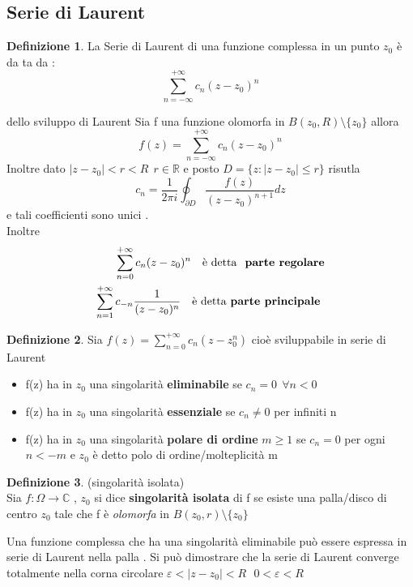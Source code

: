 \documentclass{article}
\theoremstyle{definition}
\newtheorem*{definizione}{Definizione}
\newcommand{\R}{\mathbb{R}}
\newcommand{\C}{\mathbb{C}}
\newcommand{\norm}[1]{|#1|}
\begin{document}
 				\subsection{Serie di Laurent}
 				\begin{definizione}
 					La Serie di Laurent di una funzione complessa in un punto $z_0$ è da ta da : 
 					$$\sum_{n=-\infty}^{+\infty}c_n(z-z_0)^n$$
 				\end{definizione}
 				\begin{teo}{dello sviluppo di Laurent}{}
Sia f una funzione olomorfa in $B(z_0,R) \setminus \{z_0\}$ allora 
$$f(z)=\sum_{n=-\infty}^{+\infty}c_n(z-z_0)^n$$  Inoltre dato $\norm{z-z_0}<r<R \ \ r \in \R$ e posto $D=\{z : \norm{z-z_0}\leq r\}$ risutla $$c_n=\frac{1}{2\pi i}\oint_{\partial D}\frac{f(z)}{(z-z_0)^{n+1}}dz$$ e tali coefficienti sono unici	.\\ 
Inoltre 
\begin{align*}
	\sum_{n=0}^{+\infty}c_n(z-z_0)^n \ \ \ \text{è detta \textbf{ parte regolare}} \\
	\sum_{n=1}^{+\infty} c_{-n}\frac{1}{(z-z_0)^n} \ \ \ \text{è detta \textbf{parte principale }}
	\end{align*}	\end{teo}
\begin{definizione}
	Sia $f(z)=\sum_{n=0}^{+\infty}c_n (z-z_0^n)$  cioè sviluppabile in serie di Laurent
	\begin{itemize}
		\item f(z) ha in $z_0$ una singolarità \textbf{eliminabile} se $c_n=0 \ \ \forall n <0$
		\item f(z) ha in $z_0$ una singolarità \textbf{essenziale} se $c_n\neq 0$ per infiniti n 
		\item f(z) ha in $z_0$ una singolarità \textbf{polare di ordine} $m\geq 1$ se $c_n=0$ per ogni $n <-m$ e $z_0$ è detto polo di ordine/molteplicità m
	\end{itemize}
\end{definizione} 
\begin{definizione}(singolarità isolata)\\
Sia $f: \Omega \rightarrow \C$ , $z_0$ si dice \textbf{singolarità isolata} di f se esiste una palla/disco di centro $z_0$ tale che f è \textit{olomorfa} in $B(z_0,r) \setminus \{z_0\}$ 
\end{definizione}
Una funzione complessa che ha una singolarità eliminabile può essere espressa in serie di Laurent nella palla . Si può dimostrare che la serie di Laurent converge totalmente nella corna circolare  $\varepsilon < |z-z_0|<R \ \ \ 0 < \varepsilon < R$
\end{document}

